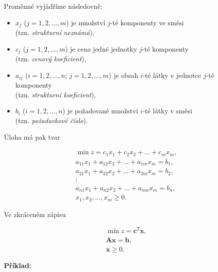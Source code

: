 Proměnné vyjádříme následovně:

\begin{itemize}[label={}]
    \item $x_j$ ($j = 1, 2, \ldots, m$) je množství $j$-té komponenty ve směsi \\(tzn. \textit{strukturní neznámá}),
    \item $c_j$ ($j = 1, 2, \ldots, m$) je cena jedné jednotky $j$-té komponenty \\(tzn. \textit{cenový koeficient}),
    \item $a_{ij}$ ($i = 1, 2, \ldots, n$; $j = 1, 2, \ldots, m$) je obsah $i$-té látky v jednotce $j$-té komponenty \\(tzn. \textit{strukturní koeficient}),
    \item $b_i$ ($i = 1, 2, \ldots, n$) je požadované množství $i$-té látky v směsi \\(tzn. \textit{požadavkové číslo}).
\end{itemize}

Úloha má pak tvar

\begin{equation}
    \begin{gathered}
        \min z = c_1x_1 + c_2x_2 + \ldots + c_mx_m, \\
        a_{11}x_1 + a_{12}x_2 + \ldots + a_{1m}x_m = b_1, \\
        a_{21}x_1 + a_{22}x_2 + \ldots + a_{2m}x_m = b_2, \\
        \vdots \\
        a_{n1}x_1 + a_{n2}x_2 + \ldots + a_{nm}x_m = b_n, \\
        x_1, x_2, \ldots, x_m \geq 0.
    \end{gathered}
\end{equation}

Ve zkráceném zápisu

\begin{equation}
    \begin{gathered}
        \min z = \bm{c}^T\bm{x}, \\
        \bm{A}\bm{x} = \bm{b}, \\
        \bm{x} \geq 0.
    \end{gathered}
\end{equation}

\textbf{Příklad:}

